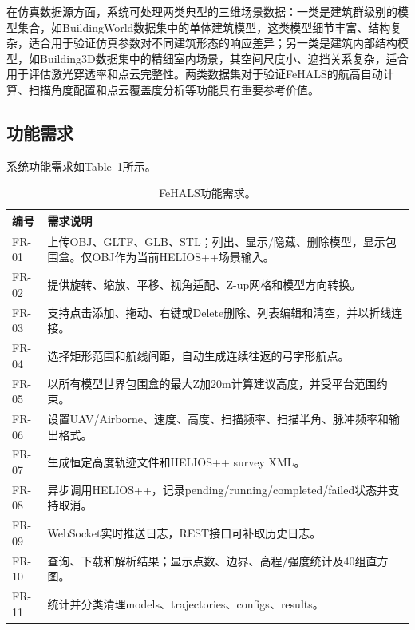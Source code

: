\documentclass[a4paper,fleqn]{cas-sc}
\newcommand{\refTab}[1]{\hyperref[#1]{Table~\ref*{#1}}}
\begin{document}
在仿真数据源方面，系统可处理两类典型的三维场景数据：一类是建筑群级别的模型集合，如BuildingWorld数据集中的单体建筑模型，这类模型细节丰富、结构复杂，适合用于验证仿真参数对不同建筑形态的响应差异；另一类是建筑内部结构模型，如Building3D数据集中的精细室内场景，其空间尺度小、遮挡关系复杂，适合用于评估激光穿透率和点云完整性。两类数据集对于验证FeHALS的航高自动计算、扫描角度配置和点云覆盖度分析等功能具有重要参考价值。

\subsection{功能需求}

系统功能需求如\refTab{tab:functions}所示。

\begin{table}[pos=!htbp]
    \centering
    \caption{FeHALS功能需求。}
    \begin{tabular*}{\textwidth}{@{\extracolsep{\fill}} l l}
        \toprule
        编号 & 需求说明 \\
        \midrule
        FR-01 & 上传OBJ、GLTF、GLB、STL；列出、显示/隐藏、删除模型，显示包围盒。仅OBJ作为当前HELIOS++场景输入。 \\
        FR-02 & 提供旋转、缩放、平移、视角适配、Z-up网格和模型方向转换。 \\
        FR-03 & 支持点击添加、拖动、右键或Delete删除、列表编辑和清空，并以折线连接。 \\
        FR-04 & 选择矩形范围和航线间距，自动生成连续往返的弓字形航点。 \\
        FR-05 & 以所有模型世界包围盒的最大Z加20m计算建议高度，并受平台范围约束。 \\
        FR-06 & 设置UAV/Airborne、速度、高度、扫描频率、扫描半角、脉冲频率和输出格式。 \\
        FR-07 & 生成恒定高度轨迹文件和HELIOS++ survey XML。 \\
        FR-08 & 异步调用HELIOS++，记录pending/running/completed/failed状态并支持取消。 \\
        FR-09 & WebSocket实时推送日志，REST接口可补取历史日志。 \\
        FR-10 & 查询、下载和解析结果；显示点数、边界、高程/强度统计及40组直方图。 \\
        FR-11 & 统计并分类清理models、trajectories、configs、results。 \\
        \bottomrule
    \end{tabular*}
    \label{tab:functions}
\end{table}
\end{document}
